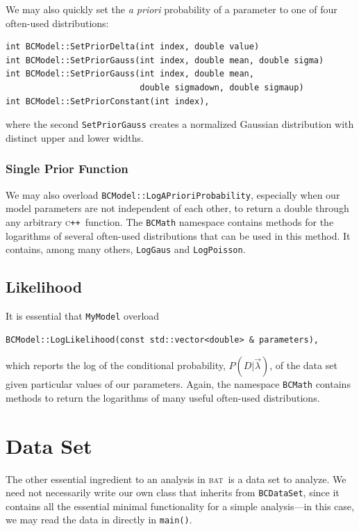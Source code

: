 \documentclass[a4paper,11pt]{article}
\newcommand{\acronym}[1]{\textsc{#1}}
\newcommand{\BAT}{\acronym{bat}}
\newcommand{\C}{\textsc{c}}
\newcommand{\CPP}{\C\texttt{++}}
\newcommand{\Icode}[1]{\texttt{#1}}
\newcommand{\BProb}[2]{\ensuremath{P(#1|#2)}}
\newcommand{\BPars}{\ensuremath{\vec{\lambda}}}
\newcommand{\BData}{\ensuremath{D}}
\newcommand{\BConditional}{\BProb{\BData}{\BPars}}
\begin{document}
We may also quickly set the \emph{a priori} probability of a
parameter to one of four often-used distributions:
\begin{verbatim}
int BCModel::SetPriorDelta(int index, double value)
int BCModel::SetPriorGauss(int index, double mean, double sigma)
int BCModel::SetPriorGauss(int index, double mean,
                           double sigmadown, double sigmaup)
int BCModel::SetPriorConstant(int index),
\end{verbatim}
where the second \Icode{SetPriorGauss} creates a normalized Gaussian
distribution with distinct upper and lower widths.


\subsubsection{Single Prior Function}

We may also overload \Icode{BCModel::LogAPrioriProbability},
especially when our model parameters are not independent of each
other, to return a double through any arbitrary \CPP\ function. The
\Icode{BCMath} namespace contains methods for the logarithms of
several often-used distributions that can be used in this method. It
contains, among many others, \Icode{LogGaus} and \Icode{LogPoisson}.


\subsection{Likelihood}

It is essential that \Icode{MyModel} overload
\begin{verbatim}
BCModel::LogLikelihood(const std::vector<double> & parameters),
\end{verbatim}
which reports the log of the conditional probability, \BConditional,
of the data set given particular values of our parameters. Again, the
namespace \Icode{BCMath} contains methods to return the logarithms of
many useful often-used distributions.



\section{Data Set}

The other essential ingredient to an analysis in \BAT\ is a data set
to analyze. We need not necessarily write our own class that inherits
from \Icode{BCDataSet}, since it contains all the essential minimal
functionality for a simple analysis---in this case, we may read the
data in directly in \Icode{main()}.
\end{document}
